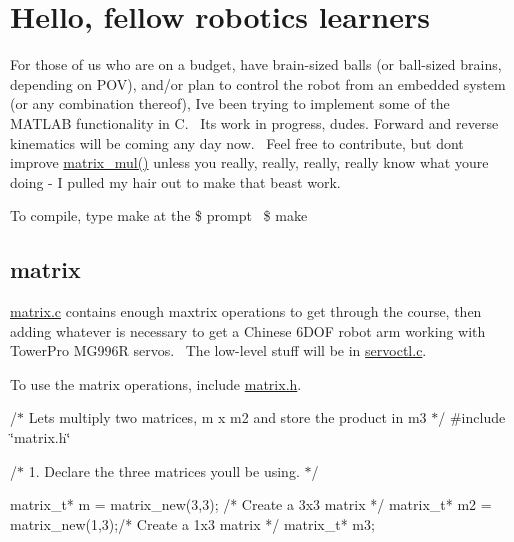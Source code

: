 \section*{Hello, fellow robotics learners}

For those of us who are on a budget, have brain-\/sized balls (or ball-\/sized brains, depending on P\+OV), and/or plan to control the robot from an embedded system (or any combination thereof), I\textquotesingle{}ve been trying to implement some of the M\+A\+T\+L\+AB functionality in C.~\newline
 I\textquotesingle{}ts work in progress, dudes. Forward and reverse kinematics will be coming any day now.~\newline
 Feel free to contribute, but don\textquotesingle{}t improve \hyperlink{matrix_8c_a1e8d8c0421f716763d5bbb5c39af0e5b}{matrix\+\_\+mul()} unless you really, really, really, really know what you\textquotesingle{}re doing -\/ I pulled my hair out to make that beast work.

To compile, type make at the \$ prompt~\newline
 \$ make

\subsection*{matrix}

\hyperlink{matrix_8c}{matrix.\+c} contains enough maxtrix operations to get through the course, then adding whatever is necessary to get a Chinese 6\+D\+OF robot arm working with Tower\+Pro M\+G996R servos.~\newline
 The low-\/level stuff will be in \hyperlink{servoctl_8c}{servoctl.\+c}.~\newline


To use the matrix operations, include \hyperlink{matrix_8h}{matrix.\+h}.~\newline


{\ttfamily }

{\ttfamily /$\ast$ Let\textquotesingle{}s multiply two matrices, m x m2 and store the product in m3 $\ast$/ \#include \char`\"{}matrix.\+h\char`\"{}}

{\ttfamily /$\ast$ 1. Declare the three matrices you\textquotesingle{}ll be using. $\ast$/ \begin{DoxyVerb}matrix_t* m = matrix_new(3,3); /* Create a 3x3 matrix */
matrix_t* m2 = matrix_new(1,3);/* Create a 1x3 matrix */
matrix_t* m3;
\end{DoxyVerb}
}

